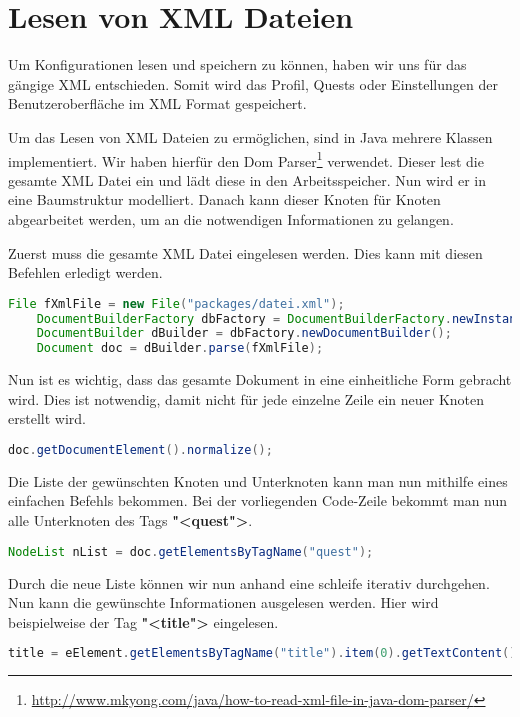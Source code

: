 \section{Lesen von XML Dateien}
Um Konfigurationen lesen und speichern zu können, haben wir uns für das gängige XML entschieden. Somit wird das Profil, Quests oder Einstellungen der Benutzeroberfläche im XML Format gespeichert.

Um das Lesen von XML Dateien zu ermöglichen, sind in Java mehrere Klassen implementiert. Wir haben hierfür den Dom Parser\footnote{\url{http://www.mkyong.com/java/how-to-read-xml-file-in-java-dom-parser/}} verwendet. Dieser lest die gesamte XML Datei ein und lädt diese in den Arbeitsspeicher. Nun wird er in eine Baumstruktur modelliert. Danach kann dieser Knoten für Knoten abgearbeitet werden, um an die notwendigen Informationen zu gelangen.

Zuerst muss die gesamte XML Datei eingelesen werden. Dies kann mit diesen Befehlen erledigt werden.
\begin{lstlisting}[language=JAVA]
	File fXmlFile = new File("packages/datei.xml");
	DocumentBuilderFactory dbFactory = DocumentBuilderFactory.newInstance();
	DocumentBuilder dBuilder = dbFactory.newDocumentBuilder();
	Document doc = dBuilder.parse(fXmlFile);
\end{lstlisting}

Nun ist es wichtig, dass das gesamte Dokument in eine einheitliche Form gebracht wird. Dies ist notwendig, damit nicht für jede einzelne Zeile ein neuer Knoten erstellt wird.
\begin{lstlisting}[language=JAVA]
	doc.getDocumentElement().normalize();
\end{lstlisting}

Die Liste der gewünschten Knoten und Unterknoten kann man nun mithilfe eines einfachen Befehls bekommen. Bei der vorliegenden Code-Zeile bekommt man nun alle Unterknoten des Tags \textbf{"<quest">}.
\begin{lstlisting}[language=JAVA]
	NodeList nList = doc.getElementsByTagName("quest");
\end{lstlisting}
Durch die neue Liste können wir nun anhand eine schleife iterativ durchgehen. Nun kann die gewünschte Informationen ausgelesen werden. Hier wird beispielweise der Tag \textbf{"<title">} eingelesen.
\begin{lstlisting}[language=JAVA]
title = eElement.getElementsByTagName("title").item(0).getTextContent();
\end{lstlisting}

